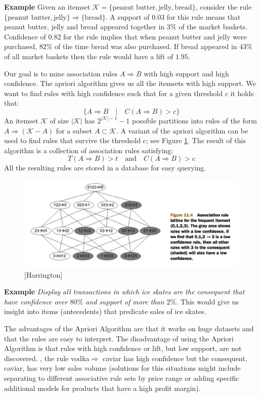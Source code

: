 \documentclass[a4paper]{article}
\begin{document}
{\bf Example}  Given an itemset $\mathcal{K}=\{\text{peanut butter},\text{jelly},\text{bread}\}$, consider the rule $\{\text{peanut butter}, \text{jelly}\}\Rightarrow\{\text{bread}\}$. A support of $0.03$ for this rule means that peanut butter, jelly and bread appeared together in $3\%$ of the market baskets. Confidence of $0.82$ for the rule implies that when peanut butter and jelly were purchased, $82\%$ of the time bread was also purchased. If bread appeared in $43\%$ of all market baskets then the rule would have a lift of $1.95$.

Our goal is to mine association rules $A\Rightarrow B$ with high support and high confidence. The apriori algorithm gives us all the itemsets with high support. We want to find rules with high confidence such that for a given threshold $c$ it holds that: 
$$\{A\Rightarrow B \quad | \quad C(A\Rightarrow B)>c\}$$
An itemset $\mathcal{K}$ of size $|\mathcal{K}|$ has $2^{|\mathcal{K}|-1}-1$ possible partitions into rules of the form $A\Rightarrow (\mathcal{K}-A)$ for a subset $A\subset\mathcal{K}$. A variant of the apriori algorithm can be used to find rules that survive the threshold $c$; see Figure \ref{fig:rules}. The result of this algorithm is a collection of association rules satisfying:
$$T(A\Rightarrow B)>t\quad \text{and} \quad C(A\Rightarrow B)>c$$
All the resulting rules are stored in a database for easy querying.

\begin{figure}
\centering
\includegraphics[width=1.0\textwidth]{RuleHierarchy.png}
\caption{\label{fig:rules}[Harrington] }
\end{figure}

{\bf Example} \textit{Display all transactions in which ice skates are the consequent that have confidence over $80\%$ and support of more than $2\%$.}  This would give us insight into items (antecedents) that predicate sales of ice skates.

The advantages of the Apriori Algorithm are that it works on huge datasets and that the rules are easy to interpret. The disadvantage of using the Apriori Algorithm is that rules with high confidence or lift, but low support, are not discovered. 
, the rule vodka$\Rightarrow$ caviar has high confidence but the consequent, caviar, has very low sales volume (solutions for this situations might include separating to different associative rule sets by price range or adding specific additional models for products that have a high profit margin).
\end{document}
